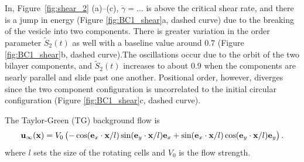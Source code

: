 \documentclass[aps,prl,preprint,groupedaddress]{revtex4-2}
\newcommand{\xx}{\mathbf{x}}
\newcommand{\uu}{\mathbf{u}}
\begin{document}
In, Figure~\ref{fig:shear_2} (a)--(c), 
$\dot\gamma= ...$ is above the critical shear rate,
and there is a jump in energy (Figure \ref{fig:BC1_shear}a, dashed curve)
due to the breaking of the vesicle into two components.  
There is greater variation in the order parameter $\tilde{S}_2(t)$ as well
with a baseline value around $0.7$
(Figure \ref{fig:BC1_shear}b, dashed curve).The oscillations occur due to the
orbit of the two bilayer components, and $\tilde{S}_2(t)$ increases
to about $0.9$ when the components are nearly parallel and slide past one another.
Positional order, however, diverges since the two component configuration
is uncorrelated to the initial circular configuration (Figure \ref{fig:BC1_shear}c, dashed curve).






%

The Taylor-Green (TG) background flow is
\begin{equation}
  \uu_\infty(\xx) = V_0 \left(-\cos({\bf e}_x\cdot\xx/l)\sin({\bf e}_y\cdot\xx/l){\bf e}_x
  +\sin({\bf e}_x\cdot\xx/l)\cos({\bf e}_y\cdot\xx/l){\bf e}_y\right).
\end{equation}
where $l$ sets the size of the rotating cells and $V_0$ is the flow strength. 
%
\end{document}
